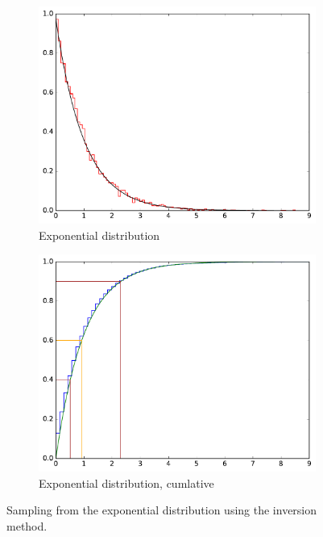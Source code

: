 \documentclass[]{article}
\begin{document}
\begin{figure}
    \centering
    \begin{subfigure}[b]{0.49\textwidth}
        \includegraphics[width=\textwidth]{figs/expo.pdf}
        \caption{Exponential distribution}
    \end{subfigure}
    \begin{subfigure}[b]{0.49\textwidth}
        \includegraphics[width=\textwidth]{figs/inversion_sampling.pdf}
        \caption{Exponential distribution, cumlative}
    \end{subfigure}
    \caption{Sampling from the exponential distribution using the inversion method.}
     \label{fig:expo_inv}
\end{figure}
\end{document}
